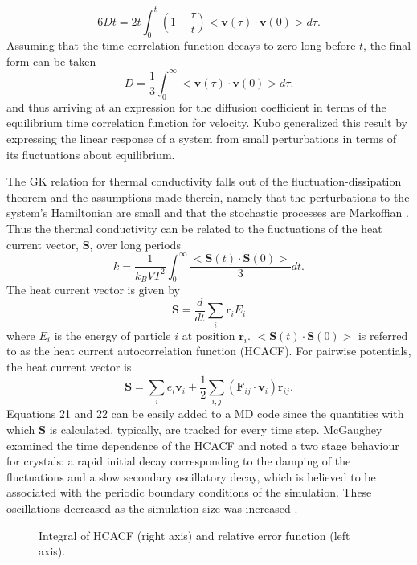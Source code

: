 %
\begin{equation}
6Dt=2t\int_0^t\left(1-\frac{\tau}{t}\right)<\bm{v}(\tau)\cdot\bm{v}(0)>d\tau.
\end{equation}
%
Assuming that the time correlation function decays to zero long before $t$, the final form can be taken
%
\begin{equation}
D=\frac{1}{3}\int_0^{\infty}<\bm{v}(\tau)\cdot\bm{v}(0)>d\tau.
\end{equation}
%
and thus arriving at an expression for the diffusion coefficient in terms of the equilibrium time correlation function for velocity. Kubo generalized this result by expressing the linear response of a system from small perturbations in terms of its fluctuations about equilibrium.

The GK relation for thermal conductivity falls out of the fluctuation-dissipation theorem and the assumptions made therein, namely that the perturbations to the system's Hamiltonian are small and that the stochastic processes are Markoffian \cite{green:398}. Thus the thermal conductivity can be related to the fluctuations of the heat current vector, $\bm{S}$, over long periods
%
\begin{equation}
k=\frac{1}{k_B V T^2}\int_0^{\infty}\frac{<\bm{S}(t)\cdot\bm{S}(0)>}{3}dt.
\end{equation}
%
The heat current vector is given by 
%
\begin{equation}
\bm{S}=\frac{d}{dt}\sum_i\bm{r}_iE_i
\end{equation}
%
where $E_i$ is the energy of particle $i$ at position $\bm{r}_i$. $<\bm{S}(t)\cdot\bm{S}(0)>$ is referred to as the heat current autocorrelation function (HCACF). For pairwise potentials, the heat current vector is
%
\begin{equation}
\bm{S}=\sum_ie_i\bm{v}_i+\frac{1}{2}\sum_{i,j}(\bm{F}_{ij}\cdot\bm{v}_{i})\bm{r}_{ij}.
\end{equation}
%
Equations 21 and 22 can be easily added to a MD code since the quantities with which $\bm{S}$ is calculated, typically, are tracked for every time step. McGaughey examined the time dependence of the HCACF and noted a two stage behaviour for crystals: a rapid initial decay corresponding to the damping of the fluctuations and a slow secondary oscillatory decay, which is believed to be associated with the periodic boundary conditions of the simulation. These oscillations decreased as the simulation size was increased \cite{mcgaugheythesis}.

\begin{figure}
\begin{center}
\renewcommand{\figure}{Fig.}
\caption{Integral of HCACF (right axis) and relative error function (left axis).}
\label{FIG:GK_bulk}
\end{center}
\end{figure}

